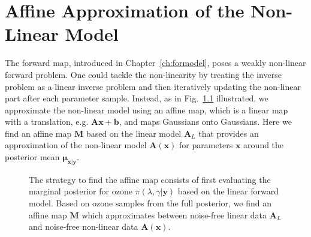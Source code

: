 \chapter{Affine Approximation of the Non-Linear Model}
\label{ch:affine}
\newcommand*{\vertbar}{\rule[-1ex]{0.5pt}{2.5ex}}
\newcommand*{\horzbar}{\rule[.5ex]{2.5ex}{0.5pt}}
The forward map, introduced in Chapter~\ref{ch:formodel}, poses a weakly non-linear forward problem.
One could tackle the non-linearity by treating the inverse problem as a linear inverse problem and then iteratively updating the non-linear part after each parameter sample.
Instead, as in Fig.~\ref{fig:affinStrat} illustrated, we approximate the non-linear model using an affine map, which is a linear map with a translation, e.g. $\bm{A}\bm{x} + \bm{b}$, and maps Gaussians onto Gaussians.
Here we find an affine map $\bm{M}$ based on the linear model $\bm{A}_L$ that provides an approximation of the non-linear model $\bm{A}(\bm{x})$ for parameters $\bm{x}$ around the posterior mean $\bm{\mu}_{\bm{x}|\bm{y}}$.
\begin{figure}[htb!]
	\centering
	\caption[Strategy to find affine map.]{The strategy to find the affine map consists of first evaluating the marginal posterior for ozone $\pi(\lambda , \gamma  | \bm{y})$ based on the linear forward model. Based on ozone samples from the full posterior, we find an affine map $\bm{M}$ which approximates between noise-free linear data $\bm{A}_L$ and noise-free non-linear data $\bm{A}(\bm{x})$.}
	\label{fig:affinStrat}
\end{figure}

